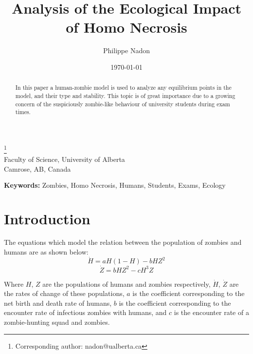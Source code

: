 \documentclass[11pt]{article}
\begin{document}
\title{Analysis of the Ecological Impact of Homo Necrosis}         %
\author{Philippe Nadon}

\date{ \today}          %
\maketitle

\footnote{Corresponding author: nadon@ualberta.ca}\\[0.5cm]
{\small Faculty of Science, University of Alberta}\\
{\small Camrose, AB, Canada}\\[0.5cm]

\thispagestyle{empty}

\doublespacing

\begin{abstract}
In this paper a human-zombie model is used to analyze any equilibrium points in the model, and their type and stability. This topic is of great importance due to a growing concern of the suspiciously zombie-like behaviour of university students during exam times.

\end{abstract}

\textbf{Keywords:} Zombies, Homo Necrosis, Humans, Students, Exams, Ecology

\newpage

\setcounter{page}{1}

\section{Introduction}

The equations which model the relation between the population of zombies and humans are as shown below:
\begin{equation}
\dot{H} = aH(1 - H) - bHZ^2
\end{equation}
\begin{equation}
\dot{Z} = bHZ^2 - cH^3Z
\end{equation}

Where $H$, $Z$ are the populations of humans and zombies respectively, $\dot{H}$, $\dot{Z}$ are the rates of change of these populations, $a$ is the coefficient corresponding to the net birth and death rate of humans, $b$ is the coefficient corresponding to the encounter rate of infectious zombies with humans, and $c$ is the encounter rate of a zombie-hunting squad and zombies.
\end{document}
